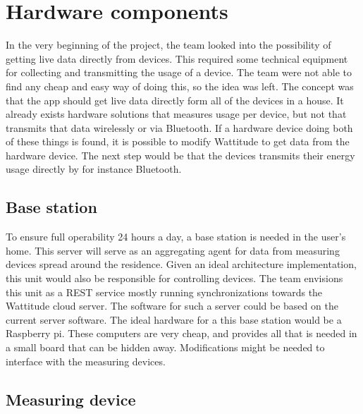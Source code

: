 \section{Hardware components}
In the very beginning of the project, the team looked into the possibility of getting live data directly from devices. This required some technical equipment for collecting and transmitting the usage of a device. The team were not able to find any cheap and easy way of doing this, so the idea was left. The concept was that the app should get live data directly form all of the devices in a house. It already exists hardware solutions that measures usage per device, but not that transmits that data wirelessly or via Bluetooth. If a hardware device doing both of these things is found, it is possible to modify Wattitude to get data from the hardware device. The next step would be that the devices transmits their energy usage directly by for instance Bluetooth. 

\subsection{Base station}
To ensure full operability 24 hours a day, a base station is needed in the user's home. This server will serve as an aggregating agent for data from measuring devices spread around the residence. Given an ideal architecture implementation, this unit would also be responsible for controlling devices. The team envisions this unit as a REST service mostly running synchronizations towards the Wattitude cloud server. The software for such a server could be based on the current server software. The ideal hardware for a this base station would be a Raspberry pi. These computers are very cheap, and provides all that is needed in a small board that can be hidden away. Modifications might be needed to interface with the measuring devices. 

\subsection{Measuring device}

